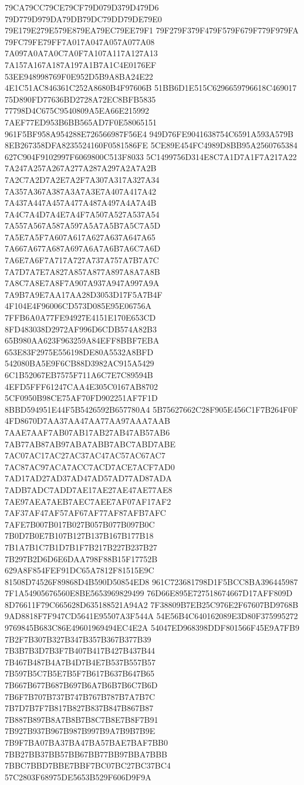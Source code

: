 79CA79CC79CE79CF79D079D379D479D6
79D779D979DA79DB79DC79DD79DE79E0
79E179E279E579E879EA79EC79EE79F1
79F279F379F479F579F679F779F979FA
79FC79FE79FF7A017A047A057A077A08
7A097A0A7A0C7A0F7A107A117A127A13
7A157A167A187A197A1B7A1C4E0176EF
53EE948998769F0E952D5B9A8BA24E22
4E1C51AC846361C252A8680B4F97606B
51BB6D1E515C6296659796618C469017
75D890FD77636BD2728A72EC8BFB5835
77798D4C675C9540809A5EA66E215992
7AEF77ED953B6BB565AD7F0E58065151
961F5BF958A954288E726566987F56E4
949D76FE9041638754C6591A593A579B
8EB267358DFA8235524160F0581586FE
5CE89E454FC4989D8BB95A2560765384
627C904F9102997F6069800C513F8033
5C1499756D314E8C7A1D7A1F7A217A22
7A247A257A267A277A287A297A2A7A2B
7A2C7A2D7A2E7A2F7A307A317A327A34
7A357A367A387A3A7A3E7A407A417A42
7A437A447A457A477A487A497A4A7A4B
7A4C7A4D7A4E7A4F7A507A527A537A54
7A557A567A587A597A5A7A5B7A5C7A5D
7A5E7A5F7A607A617A627A637A647A65
7A667A677A687A697A6A7A6B7A6C7A6D
7A6E7A6F7A717A727A737A757A7B7A7C
7A7D7A7E7A827A857A877A897A8A7A8B
7A8C7A8E7A8F7A907A937A947A997A9A
7A9B7A9E7AA17AA28D3053D17F5A7B4F
4F104E4F96006CD573D085E95E06756A
7FFB6A0A77FE94927E4151E170E653CD
8FD483038D2972AF996D6CDB574A82B3
65B980AA623F963259A84EFF8BBF7EBA
653E83F2975E556198DE80A5532A8BFD
542080BA5E9F6CB88D3982AC915A5429
6C1B52067EB7575F711A6C7E7C89594B
4EFD5FFF61247CAA4E305C0167AB8702
5CF0950B98CE75AF70FD902251AF7F1D
8BBD594951E44F5B5426592B657780A4
5B75627662C28F905E456C1F7B264F0F
4FD8670D7AA37AA47AA77AA97AAA7AAB
7AAE7AAF7AB07AB17AB27AB47AB57AB6
7AB77AB87AB97ABA7ABB7ABC7ABD7ABE
7AC07AC17AC27AC37AC47AC57AC67AC7
7AC87AC97ACA7ACC7ACD7ACE7ACF7AD0
7AD17AD27AD37AD47AD57AD77AD87ADA
7ADB7ADC7ADD7AE17AE27AE47AE77AE8
7AE97AEA7AEB7AEC7AEE7AF07AF17AF2
7AF37AF47AF57AF67AF77AF87AFB7AFC
7AFE7B007B017B027B057B077B097B0C
7B0D7B0E7B107B127B137B167B177B18
7B1A7B1C7B1D7B1F7B217B227B237B27
7B297B2D6D6E6DAA798F88B15F17752B
629A8F854FEF91DC65A7812F81515E9C
81508D74526F89868D4B590D50854ED8
961C723681798D1F5BCC8BA396445987
7F1A54905676560E8BE5653969829499
76D66E895E727518674667D17AFF809D
8D76611F79C665628D635188521A94A2
7F38809B7EB25C976E2F67607BD9768B
9AD8818F7F947CD5641E95507A3F544A
54E56B4C640162089E3D80F375995272
9769845B683C86E49601969494EC4E2A
54047ED968398DDF801566F45E9A7FB9
7B2F7B307B327B347B357B367B377B39
7B3B7B3D7B3F7B407B417B427B437B44
7B467B487B4A7B4D7B4E7B537B557B57
7B597B5C7B5E7B5F7B617B637B647B65
7B667B677B687B697B6A7B6B7B6C7B6D
7B6F7B707B737B747B767B787B7A7B7C
7B7D7B7F7B817B827B837B847B867B87
7B887B897B8A7B8B7B8C7B8E7B8F7B91
7B927B937B967B987B997B9A7B9B7B9E
7B9F7BA07BA37BA47BA57BAE7BAF7BB0
7BB27BB37BB57BB67BB77BB97BBA7BBB
7BBC7BBD7BBE7BBF7BC07BC27BC37BC4
57C2803F68975DE5653B529F606D9F9A
